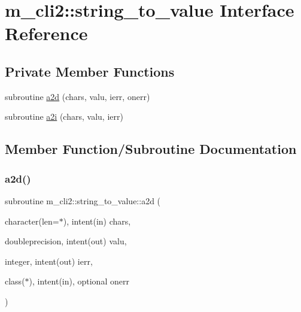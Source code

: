 \hypertarget{interfacem__cli2_1_1string__to__value}{}\section{m\+\_\+cli2\+:\+:string\+\_\+to\+\_\+value Interface Reference}
\label{interfacem__cli2_1_1string__to__value}
\subsection*{Private Member Functions}
\begin{DoxyCompactItemize}
\item 
subroutine \mbox{\hyperlink{interfacem__cli2_1_1string__to__value_ad579c3183bd46ec64ac2f6517b71da0e}{a2d}} (chars, valu, ierr, onerr)
\item 
subroutine \mbox{\hyperlink{interfacem__cli2_1_1string__to__value_af221de32e1c7dd6915ea45dc3a0147ed}{a2i}} (chars, valu, ierr)
\end{DoxyCompactItemize}


\subsection{Member Function/\+Subroutine Documentation}
\mbox{\label{interfacem__cli2_1_1string__to__value_ad579c3183bd46ec64ac2f6517b71da0e}} 
\subsubsection{\texorpdfstring{a2d()}{a2d()}}
{\footnotesize\ttfamily subroutine m\+\_\+cli2\+::string\+\_\+to\+\_\+value\+::a2d (\begin{DoxyParamCaption}\item[{character(len=$\ast$), intent(in)}]{chars,  }\item[{doubleprecision, intent(out)}]{valu,  }\item[{integer, intent(out)}]{ierr,  }\item[{class($\ast$), intent(in), optional}]{onerr }\end{DoxyParamCaption})\hspace{0.3cm}{\ttfamily [private]}}

